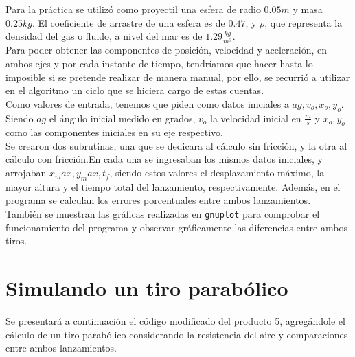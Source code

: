 \documentclass[a4paper]{article}
\begin{document}
Para la práctica se utilizó como proyectil una esfera de radio $0.05 m$ y masa $0.25 kg$. El coeficiente de arrastre de una esfera es de $0.47$, y $\rho$, que representa la densidad del gas o fluido, a nivel del mar es de $1.29 \frac{kg}{m^3}$. \\

Para poder obtener las componentes de posición, velocidad y aceleración, en ambos ejes y por cada instante de tiempo, tendríamos que hacer hasta lo imposible si se pretende realizar de manera manual, por ello, se recurrió a utilizar en el algoritmo un ciclo que se hiciera cargo de estas cuentas. \\

Como valores de entrada, tenemos que piden como datos iniciales a $ag, v_o, x_o, y_o$. Siendo $ag$ el ángulo inicial medido en grados, $v_o$ la velocidad inicial en $\frac{m}{s}$ y $x_o, y_o$ como las componentes iniciales en su eje respectivo.\\

Se crearon dos subrutinas, una que se dedicara al cálculo sin fricción, y la otra al cálculo con fricción.En cada una se ingresaban los mismos datos iniciales, y arrojaban $x_max, y_max, t_f$, siendo estos valores el desplazamiento máximo, la mayor altura y el tiempo total del lanzamiento, respectivamente. Además, en el programa se calculan los errores porcentuales entre ambos lanzamientos. \\

También se muestran las gráficas realizadas en \texttt{gnuplot} para comprobar el funcionamiento del programa y observar gráficamente las diferencias entre ambos tiros.

\section{Simulando un tiro parabólico}
Se presentará a continuación el código modificado del producto 5, agregándole el cálculo de un tiro parabólico considerando la resistencia del aire y comparaciones entre ambos lanzamientos.
\end{document}
